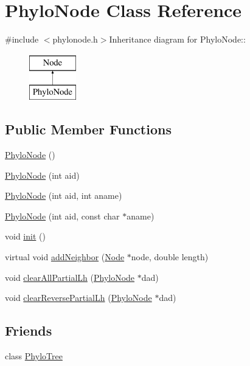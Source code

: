 \hypertarget{classPhyloNode}{
\section{PhyloNode Class Reference}
\label{classPhyloNode}
}


{\ttfamily \#include $<$phylonode.h$>$}Inheritance diagram for PhyloNode::\begin{figure}[H]
\begin{center}
\leavevmode
\includegraphics[height=2cm]{classPhyloNode}
\end{center}
\end{figure}
\subsection*{Public Member Functions}
\begin{DoxyCompactItemize}
\item 
\hyperlink{classPhyloNode_a82abba4349a6808ba134a89fae92fb7f}{PhyloNode} ()
\item 
\hyperlink{classPhyloNode_a07225896ff0a5e57a286f6deedef2421}{PhyloNode} (int aid)
\item 
\hyperlink{classPhyloNode_ae89376e4022663801fb2d83e2d55afbe}{PhyloNode} (int aid, int aname)
\item 
\hyperlink{classPhyloNode_aa0ef98742403e238c9ee2789cc9d4a51}{PhyloNode} (int aid, const char $\ast$aname)
\item 
void \hyperlink{classPhyloNode_abb09e14a95714aa6d590c893700be656}{init} ()
\item 
virtual void \hyperlink{classPhyloNode_a626f3e6259921ebf7769dcb19858c825}{addNeighbor} (\hyperlink{classNode}{Node} $\ast$node, double length)
\item 
void \hyperlink{classPhyloNode_a70a516028a492af1eb1a5108d04cbc5f}{clearAllPartialLh} (\hyperlink{classPhyloNode}{PhyloNode} $\ast$dad)
\item 
void \hyperlink{classPhyloNode_ad752a7a4155b10d7b46d1f92afa9acc5}{clearReversePartialLh} (\hyperlink{classPhyloNode}{PhyloNode} $\ast$dad)
\end{DoxyCompactItemize}
\subsection*{Friends}
\begin{DoxyCompactItemize}
\item 
\hypertarget{classPhyloNode_a38fa7a30e653e52f48d662f26bd549be}{
class \hyperlink{classPhyloNode_a38fa7a30e653e52f48d662f26bd549be}{PhyloTree}}
\label{classPhyloNode_a38fa7a30e653e52f48d662f26bd549be}

\end{DoxyCompactItemize}


